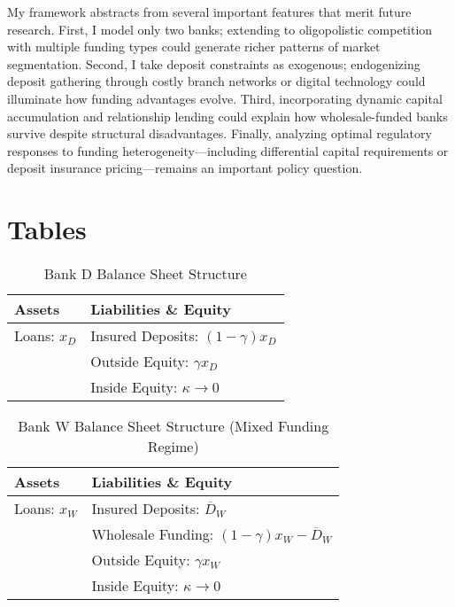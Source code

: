 \documentclass[12pt]{article}
\begin{document}
My framework abstracts from several important features that merit future research. First, I model only two banks; extending to oligopolistic competition with multiple funding types could generate richer patterns of market segmentation. Second, I take deposit constraints as exogenous; endogenizing deposit gathering through costly branch networks or digital technology could illuminate how funding advantages evolve. Third, incorporating dynamic capital accumulation and relationship lending could explain how wholesale-funded banks survive despite structural disadvantages. Finally, analyzing optimal regulatory responses to funding heterogeneity—including differential capital requirements or deposit insurance pricing—remains an important policy question.




\appendix
\setcounter{secnumdepth}{4}

\section{Tables}
\label{app:tables}

\begin{table}[h!]
\centering
\caption{Bank D Balance Sheet Structure}
\begin{tabular}{ll}
\toprule
\textbf{Assets} & \textbf{Liabilities \& Equity} \\
\midrule
Loans: $x_D$ & Insured Deposits: $(1-\gamma)x_D$ \\
              & Outside Equity: $\gamma x_D$ \\
              & Inside Equity: $\kappa \to 0$ \\
\bottomrule
\end{tabular}
\label{tab:bankD_bs}
\end{table}

\begin{table}[h!]
\centering
\caption{Bank W Balance Sheet Structure (Mixed Funding Regime)}
\begin{tabular}{ll}
\toprule
\textbf{Assets} & \textbf{Liabilities \& Equity} \\
\midrule
Loans: $x_W$ & Insured Deposits: $\overline{D}_{W}$ \\
              & Wholesale Funding: $(1-\gamma)x_{W}-\overline{D}_{W}$ \\
              & Outside Equity: $\gamma x_W$ \\
              & Inside Equity: $\kappa \to 0$ \\
\bottomrule
\end{tabular}
\label{tab:bankW_bs}
\end{table}
\end{document}
